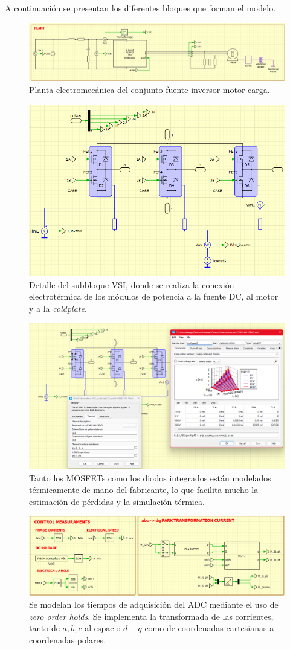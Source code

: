 A continuación se presentan los diferentes bloques que forman el modelo.
\begin{figure}[H]
	\centering
	\includegraphics[width=0.7\linewidth]{fig/PLECS_plant}
	\caption{Planta electromecánica del conjunto fuente-inversor-motor-carga.}
\end{figure}

\begin{figure}[H]
	\centering
	\includegraphics[width=0.7\linewidth]{fig/PLECS_mosfets}
	\caption{Detalle del subbloque VSI, donde se realiza la conexión electrotérmica de los módulos de potencia a la fuente DC, al motor y a la \textit{coldplate}.}
\end{figure}
\begin{figure}[H]
	\centering
	\includegraphics[width=0.7\linewidth]{fig/PLECS_MOSFETs-thermal}
	\caption{Tanto los MOSFETs como los diodos integrados están modelados térmicamente de mano del fabricante, lo que facilita mucho la estimación de pérdidas y la simulación térmica.}
\end{figure}
\begin{figure}[H]
	\centering
	\includegraphics[width=0.7\linewidth]{fig/PLECS_acq}
	\caption{Se modelan los tiempos de adquisición del ADC mediante el uso de \textit{zero order holds}. Se implementa la transformada de las corrientes, tanto de $a,b,c$ al espacio $d-q$ como de coordenadas cartesianas a coordenadas polares.}
\end{figure}
